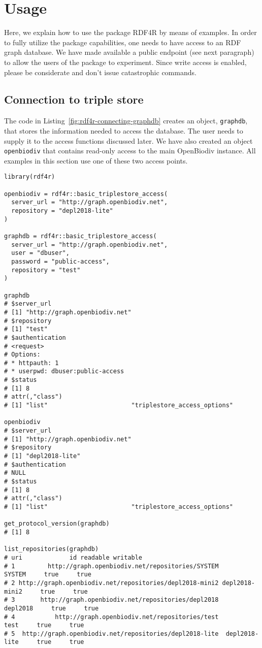 \section{Usage}

Here, we explain how to use the package RDF4R by means of examples. In order to fully utilize the package capabilities, one needs to have access to an RDF graph database. We have made available a public endpoint (see next paragraph) to allow the users of the package to experiment. Since write access is enabled, please be considerate and don't issue catastrophic commands.

\subsection{Connection to triple store}

The code in Listing~\ref{fig:rdf4r-connecting-graphdb} creates an object, {\tt graphdb}, that stores the information needed to access the database. The user needs to supply it to the access functions discussed later. We have also created an object {\tt openbiodiv} that contains read-only access to the main OpenBiodiv instance. All examples in this section use one of these two access points.

\begin{lstlisting}[language=SPARQL,
caption=R code: connecting to an RDF database using RDF4R. Outputs are given as comments after the statements.,
label=fig:rdf4r-connecting-graphdb,
basicstyle=\ttfamily\tiny]
library(rdf4r)

openbiodiv = rdf4r::basic_triplestore_access(
  server_url = "http://graph.openbiodiv.net",
  repository = "depl2018-lite"
)

graphdb = rdf4r::basic_triplestore_access(
  server_url = "http://graph.openbiodiv.net",
  user = "dbuser",
  password = "public-access",
  repository = "test"
)

graphdb
# $server_url
# [1] "http://graph.openbiodiv.net"
# $repository
# [1] "test"
# $authentication
# <request>
# Options:
# * httpauth: 1
# * userpwd: dbuser:public-access
# $status
# [1] 8
# attr(,"class")
# [1] "list"                       "triplestore_access_options"

openbiodiv
# $server_url
# [1] "http://graph.openbiodiv.net"
# $repository
# [1] "depl2018-lite"
# $authentication
# NULL
# $status
# [1] 8
# attr(,"class")
# [1] "list"                       "triplestore_access_options"

get_protocol_version(graphdb)
# [1] 8

list_repositories(graphdb)
# uri             id readable writable
# 1         http://graph.openbiodiv.net/repositories/SYSTEM         SYSTEM     true     true
# 2 http://graph.openbiodiv.net/repositories/depl2018-mini2 depl2018-mini2     true     true
# 3       http://graph.openbiodiv.net/repositories/depl2018       depl2018     true     true
# 4           http://graph.openbiodiv.net/repositories/test           test     true     true
# 5  http://graph.openbiodiv.net/repositories/depl2018-lite  depl2018-lite     true     true
\end{lstlisting}

